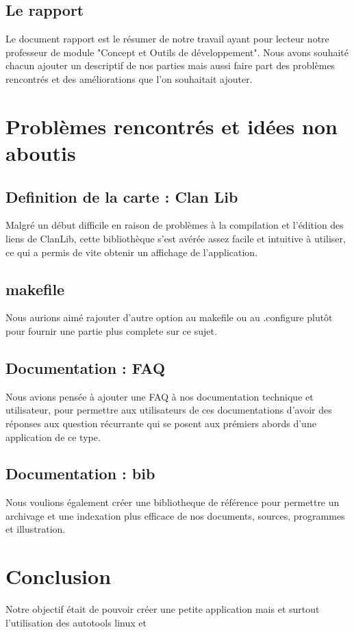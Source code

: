 \documentclass[a4paper 12pts]{article}
\begin{document}
\subsection{Le rapport}

Le document rapport est le résumer de notre travail ayant pour lecteur notre professeur de module "Concept et Outils de développement".
Nous avons souhaité chacun ajouter un descriptif de nos parties mais aussi faire part des problèmes rencontrés et des  améliorations que l'on souhaitait ajouter.

\newpage
\section{Problèmes rencontrés et idées non aboutis}

\subsection{Definition de la carte : Clan Lib}
Malgré un début difficile en raison de problèmes à la compilation et l'édition des liens de ClanLib, cette bibliothèque s'est avérée assez facile et intuitive à utiliser, ce qui a permis de vite obtenir un affichage de l'application.

\subsection{makefile}
Nous aurions aimé rajouter d'autre option au makefile ou au .configure plutôt pour fournir une partie plus complete sur ce sujet.

\subsection{Documentation : FAQ}

Nous avions pensée à ajouter une FAQ à nos documentation technique et utilisateur, pour permettre aux utilisateurs de ces documentations d'avoir des réponses aux question récurrante qui se posent aux prémiers abords d'une application de ce type.

\subsection{Documentation : bib}

Nous voulions également créer une bibliotheque de référence pour permettre un archivage et une indexation plus efficace de nos documents, sources, programmes et illustration.



\section{Conclusion}

Notre objectif était de pouvoir créer une petite application mais et surtout l'utilisation des autotools linux et
\end{document}
